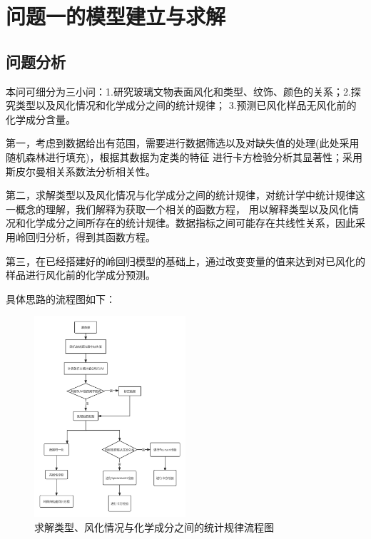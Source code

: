\documentclass[UTF8]{ctexart}
\begin{document}
            \section{问题一的模型建立与求解}
            \subsection{问题分析}
            本问可细分为三小问：1.研究玻璃文物表面风化和类型、纹饰、颜色的关系；2.探究类型以及风化情况和化学成分之间的统计规律；
            3.预测已风化样品无风化前的化学成分含量。

            第一，考虑到数据给出有范围，需要进行数据筛选以及对缺失值的处理(此处采用随机森林进行填充)，根据其数据为定类的特征
            进行卡方检验分析其显著性；采用斯皮尔曼相关系数法分析相关性。

            第二，求解类型以及风化情况与化学成分之间的统计规律，对统计学中统计规律这一概念的理解，我们解释为获取一个相关的函数方程，
            用以解释类型以及风化情况和化学成分之间所存在的统计规律。数据指标之间可能存在共线性关系，因此采用岭回归分析，得到其函数方程。

            第三，在已经搭建好的岭回归模型的基础上，通过改变变量的值来达到对已风化的样品进行风化前的化学成分预测。

            具体思路的流程图如下：
            \begin{figure}[H]\centering
                \includegraphics[width=0.5\textwidth,height=0.65\textwidth]{img/第一问流程图.png} %
                \caption{求解类型、风化情况与化学成分之间的统计规律流程图} %
                \label{fig:figure 1} %
            \end{figure}
\end{document}
